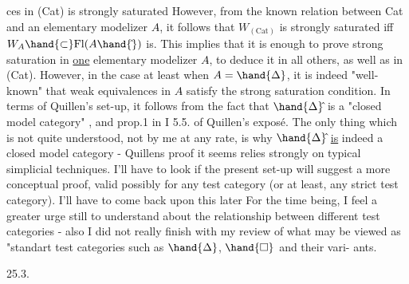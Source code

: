 
ces in (Cat) is strongly saturated\hand{\unsure{(*)}} However, from the known relation
between Cat and an elementary modelizer $A\hat{}$, it follows that $W_{(\mathrm{Cat})}$ is
strongly saturated iff $W_A \hand{\subset} \mathrm{Fl}(A\hand{\hat{}})$ is. This implies that it is enough to
prove strong saturation in \uline{one} elementary modelizer $A\hat{}$, to deduce it in
all others, as well as in (Cat). However, in the case at least when
$A = \hand{\Delta}$, it is indeed "well-known" that  weak equivalences in $A\hat{}$ satisfy the
strong saturation condition. In terms of Quillen's set-up, it follows
from the fact that $\hand{\Delta}\hat{}$ is a "closed model category" , and prop.1 in I 5.5.
of Quillen's expos\'e. The only thing which is not quite understood, not by
me at any rate, is why $\hand{\Delta}\hat{}$ \uline{is} indeed a closed model category - Quillens
proof it seems relies strongly on typical simplicial techniques. I'll have
to look if the present set-up will suggest a more conceptual proof, valid
possibly for any test category (or at least, any strict test category).
I'll have to come back upon this later  For the time being, I feel
a greater urge still to understand about the relationship between different
test categories\hand{,} - also\hand{,} I did not really finish with my review of what
may be viewed as  "standart test categories such as $\hand{\Delta}$, $\hand{\square}$ and their vari-%
ants.

25.3.

